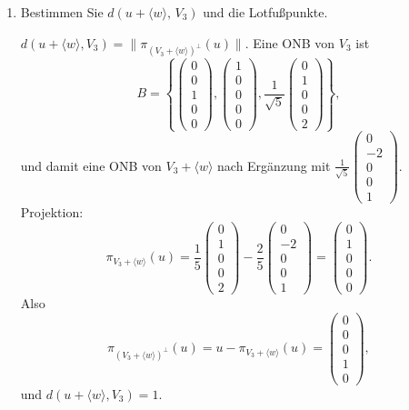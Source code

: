 \documentclass[11pt, a4paper]{article}
\begin{document}
\begin{enumerate}
  \item Bestimmen Sie $d\!\left(u+\langle w\rangle,\,V_{3}\right)$ und die Lotfußpunkte.
  \begin{framed}
  $d(u+\langle w\rangle,V_3)=\|\pi_{(V_3+\langle w\rangle)^\perp}(u)\|$.
  Eine ONB von $V_3$ ist
  \[
  B=\left\{\begin{pmatrix}0\\0\\1\\0\\0\end{pmatrix},
  \begin{pmatrix}1\\0\\0\\0\\0\end{pmatrix},
  \frac{1}{\sqrt5}\begin{pmatrix}0\\1\\0\\0\\2\end{pmatrix}\right\},
  \]
  und damit eine ONB von $V_3+\langle w\rangle$ nach Ergänzung mit
  $\frac{1}{\sqrt5}\begin{pmatrix}0\\-2\\0\\0\\1\end{pmatrix}$.
  Projektion:
  \[
  \pi_{V_3+\langle w\rangle}(u)
  =\frac{1}{5}\begin{pmatrix}0\\1\\0\\0\\2\end{pmatrix}
  -\frac{2}{5}\begin{pmatrix}0\\-2\\0\\0\\1\end{pmatrix}
  =\begin{pmatrix}0\\1\\0\\0\\0\end{pmatrix}.
  \]
  Also
  \[
  \pi_{(V_3+\langle w\rangle)^\perp}(u)
  =u-\pi_{V_3+\langle w\rangle}(u)
  =\begin{pmatrix}0\\0\\0\\1\\0\end{pmatrix},
  \]
  und $d(u+\langle w\rangle,V_3)=1$.


\end{framed}
\end{enumerate}
\end{document}
